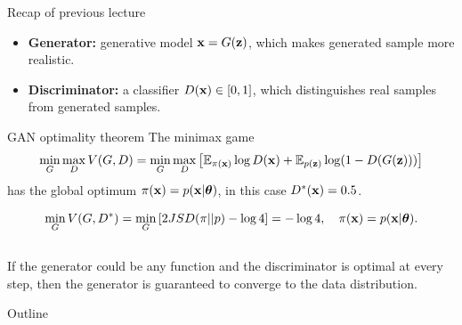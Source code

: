 \begin{frame}{Recap of previous lecture}
	\begin{itemize}
		\item \textbf{Generator:} generative model $\mathbf{x} = G(\mathbf{z})$, which makes generated sample more realistic.
		\item \textbf{Discriminator:} a classifier $D(\mathbf{x}) \in [0, 1]$, which distinguishes real samples from generated samples.
	\end{itemize}
	
	\begin{block}{GAN optimality theorem}
		The minimax game 
		\vspace{-0.2cm}
		\[
			\min_{G} \max_D V(G, D) = \min_{G} \max_D \left[ \mathbb{E}_{\pi(\mathbf{x})} \log D(\mathbf{x}) + \mathbb{E}_{p(\mathbf{z})} \log (1 - D(G(\mathbf{z}))) \right]
		\]
		 has the global optimum $\pi(\mathbf{x}) = p(\mathbf{x} | \boldsymbol{\theta})$, in this case $D^*(\mathbf{x}) = 0.5$.
	\end{block}
	\vspace{-0.5cm}
	\[
		\min_{G} V(G, D^*) = \min_{G} \left[ 2 JSD(\pi || p) - \log 4 \right] = -\log 4, \quad \pi(\mathbf{x}) = p(\mathbf{x} | \boldsymbol{\theta}).
	\]
	\vspace{-0.4cm} \\
	If the generator could be any function and the discriminator is optimal at every step, then the generator is guaranteed to converge to the data distribution.
\end{frame}
\begin{frame}{Outline}
	\tableofcontents
\end{frame}
